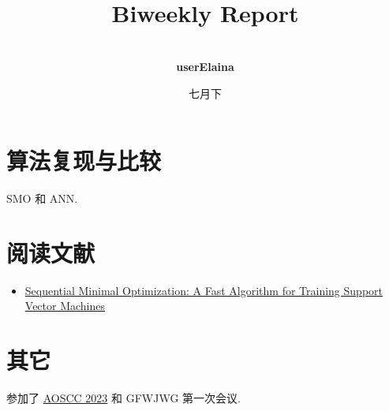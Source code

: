 \documentclass[a4paper]{article}
\title{
    \vspace*{1.5in}
     \\
    \vspace*{1in}
    \textbf{\huge Biweekly Report}
    \vspace{0.5in}
}
\author{ \\
    \textbf{userElaina} \\
    \vspace*{1in}
}
\date{七月下}
\begin{document}
\maketitle
\tableofcontents
\thispagestyle{empty}
\newpage


\section{算法复现与比较}

SMO 和 ANN.

\section{阅读文献}

\begin{itemize}
    \item \href{https://www.microsoft.com/en-us/research/publication/sequential-minimal-optimization-a-fast-algorithm-for-training-support-vector-machines/}{Sequential Minimal Optimization: A Fast Algorithm for Training Support Vector Machines}
\end{itemize}

\section{其它}

参加了 \href{https://wiki.aosc.io/zh/community/aoscc/2023/}{AOSCC 2023} 和 GFWJWG 第一次会议.
\end{document}
